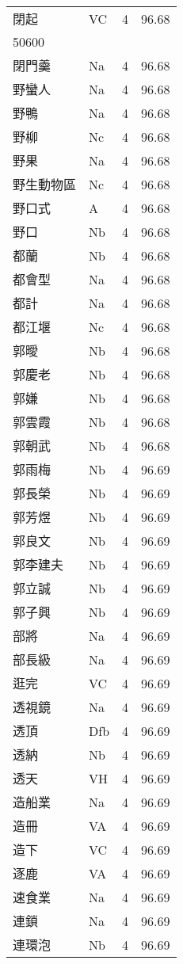 \documentclass[twocolumn]{book}
\begin{document}
\begin{supertabular}{llrr}
閉起 & VC & 4 &  96.68\\
50600\\
閉門羹 & Na & 4 &  96.68\\
野蠻人 & Na & 4 &  96.68\\
野鴨 & Na & 4 &  96.68\\
野柳 & Nc & 4 &  96.68\\
野果 & Na & 4 &  96.68\\
野生動物區 & Nc & 4 &  96.68\\
野口式 & A & 4 &  96.68\\
野口 & Nb & 4 &  96.68\\
都蘭 & Nb & 4 &  96.68\\
都會型 & Na & 4 &  96.68\\
都計 & Na & 4 &  96.68\\
都江堰 & Nc & 4 &  96.68\\
郭曖 & Nb & 4 &  96.68\\
郭慶老 & Nb & 4 &  96.68\\
郭嫌 & Nb & 4 &  96.68\\
郭雲霞 & Nb & 4 &  96.68\\
郭朝武 & Nb & 4 &  96.68\\
郭雨梅 & Nb & 4 &  96.69\\
郭長榮 & Nb & 4 &  96.69\\
郭芳煜 & Nb & 4 &  96.69\\
郭良文 & Nb & 4 &  96.69\\
郭李建夫 & Nb & 4 &  96.69\\
郭立誠 & Nb & 4 &  96.69\\
郭子興 & Nb & 4 &  96.69\\
部將 & Na & 4 &  96.69\\
部長級 & Na & 4 &  96.69\\
逛完 & VC & 4 &  96.69\\
透視鏡 & Na & 4 &  96.69\\
透頂 & Dfb & 4 &  96.69\\
透納 & Nb & 4 &  96.69\\
透天 & VH & 4 &  96.69\\
造船業 & Na & 4 &  96.69\\
造冊 & VA & 4 &  96.69\\
造下 & VC & 4 &  96.69\\
逐鹿 & VA & 4 &  96.69\\
速食業 & Na & 4 &  96.69\\
連鎖 & Na & 4 &  96.69\\
連環泡 & Nb & 4 &  96.69\\

\end{supertabular}
\end{document}
